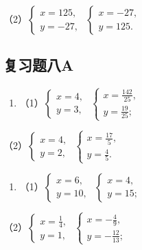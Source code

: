 （2）\(\left\{ \begin{array}{l} x = 125, \\ y = -27, \end{array} \right.\) \(\left\{ \begin{array}{l} x = -27, \\ y = 125. \end{array} \right.\)

\subsection{复习题八A}

\begin{enumerate}
\item
  （1）\(\left\{ \begin{array}{l} x = 4, \\ y = 3, \end{array} \right.\) \(\left\{ \begin{array}{l} x = \frac{142}{25}, \\ y = \frac{19}{25}; \end{array} \right.\)
\end{enumerate}

（2）\(\left\{ \begin{array}{l} x = 4, \\ y = 2, \end{array} \right.\) \(\left\{ \begin{array}{l} x = \frac{17}{5}, \\ y = \frac{4}{5}. \end{array} \right.\)

\begin{enumerate}[start=2]
\item
  （1）\(\left\{ \begin{array}{l} x = 6, \\ y = 10, \end{array} \right.\) \(\left\{ \begin{array}{l} x = 4, \\ y = 15; \end{array} \right.\)
\end{enumerate}

（2）\(\left\{ \begin{array}{l} x = \frac{1}{4}, \\ y = 1, \end{array} \right.\) \(\left\{ \begin{array}{l} x = -\frac{4}{9}, \\ y = -\frac{12}{13}; \end{array} \right.\)

